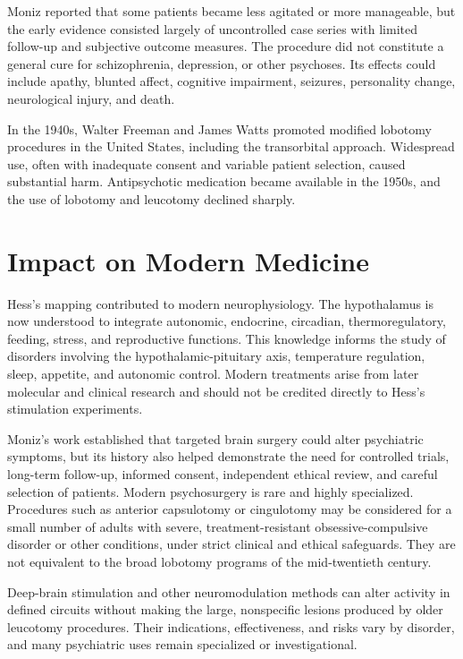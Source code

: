 Moniz reported that some patients became less agitated or more manageable, but the early evidence consisted largely of uncontrolled case series with limited follow-up and subjective outcome measures. The procedure did not constitute a general cure for schizophrenia, depression, or other psychoses. Its effects could include apathy, blunted affect, cognitive impairment, seizures, personality change, neurological injury, and death.

In the 1940s, Walter Freeman and James Watts promoted modified lobotomy procedures in the United States, including the transorbital approach. Widespread use, often with inadequate consent and variable patient selection, caused substantial harm. Antipsychotic medication became available in the 1950s, and the use of lobotomy and leucotomy declined sharply.

\section{Impact on Modern Medicine}

Hess's mapping contributed to modern neurophysiology. The hypothalamus is now understood to integrate autonomic, endocrine, circadian, thermoregulatory, feeding, stress, and reproductive functions. This knowledge informs the study of disorders involving the hypothalamic-pituitary axis, temperature regulation, sleep, appetite, and autonomic control. Modern treatments arise from later molecular and clinical research and should not be credited directly to Hess's stimulation experiments.

Moniz's work established that targeted brain surgery could alter psychiatric symptoms, but its history also helped demonstrate the need for controlled trials, long-term follow-up, informed consent, independent ethical review, and careful selection of patients. Modern psychosurgery is rare and highly specialized. Procedures such as anterior capsulotomy or cingulotomy may be considered for a small number of adults with severe, treatment-resistant obsessive-compulsive disorder or other conditions, under strict clinical and ethical safeguards. They are not equivalent to the broad lobotomy programs of the mid-twentieth century.

Deep-brain stimulation and other neuromodulation methods can alter activity in defined circuits without making the large, nonspecific lesions produced by older leucotomy procedures. Their indications, effectiveness, and risks vary by disorder, and many psychiatric uses remain specialized or investigational.

